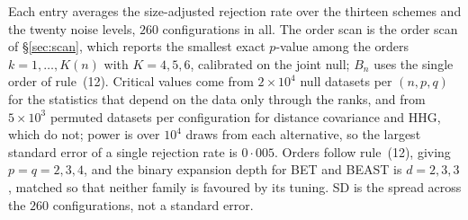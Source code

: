 \begin{table}
\begin{tabnote}
Each entry averages the size-adjusted rejection rate over the thirteen schemes and the twenty noise levels, $260$ configurations in all. The order scan is the order scan of \S\ref{sec:scan}, which reports the smallest exact $p$-value among the orders $k = 1,\ldots,K(n)$ with $K = 4, 5, 6$, calibrated on the joint null; $B_n$ uses the single order of rule~(12). Critical values come from $2\times10^4$ null datasets per $(n,p,q)$ for the statistics that depend on the data only through the ranks, and from $5\times10^3$ permuted datasets per configuration for distance covariance and HHG, which do not; power is over $10^4$ draws from each alternative, so the largest standard error of a single rejection rate is $0{\cdot}005$. Orders follow rule~(12), giving $p=q=2,3,4$, and the binary expansion depth for BET and BEAST is $d=2,3,3$, matched so that neither family is favoured by its tuning. SD is the spread across the $260$ configurations, not a standard error.
\end{tabnote}
\label{tab:power_summary}
\end{table}
